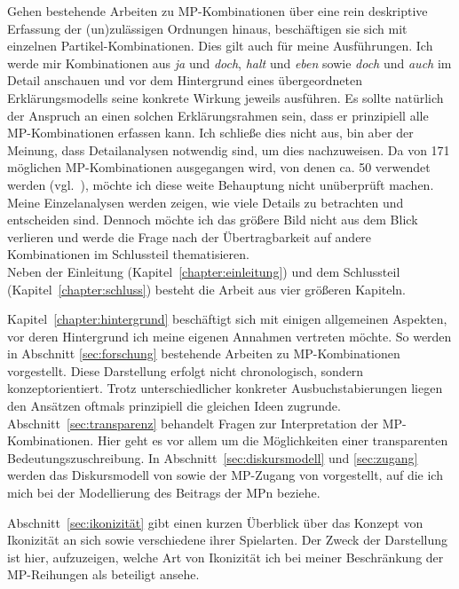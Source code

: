 \noindent
Gehen bestehende Arbeiten zu MP-Kom\-bi\-na\-ti\-on\-en über eine rein deskriptive Erfassung der (un)zulässigen Ordnungen hinaus, beschäftigen sie sich mit einzelnen Partikel-Kombinationen. Dies gilt auch für meine Ausführungen. Ich werde mir Kombinationen aus \textit{ja} und \textit{doch}, \textit{halt} und \textit{eben} sowie \textit{doch} und \textit{auch} im Detail anschauen und vor dem Hintergrund eines übergeordneten Erklärungsmodells seine konkrete Wirkung jeweils ausführen. Es sollte natürlich der Anspruch an einen solchen Erklärungsrahmen sein, dass er prinzipiell alle MP-Kom\-bi\-na\-ti\-on\-en erfassen kann. Ich schließe dies nicht aus, bin aber der Meinung, dass Detailana\-lysen notwendig sind, um dies nachzuweisen. Da von 171 möglichen MP-Kombi\-nationen ausgegangen wird, von denen ca. 50 verwendet werden (vgl.\ \citealt[280]{Thurmair1989}), möchte ich diese weite Behauptung nicht unüberprüft machen. Meine Einzelanalysen werden zeigen, wie viele Details zu betrachten und entscheiden sind. Dennoch möchte ich das größere Bild nicht aus dem Blick verlieren und werde die Frage nach der Übertragbarkeit auf andere Kombinationen im Schluss\-teil thematisieren. \\

\noindent
Neben der Einleitung (Kapitel~\ref{chapter:einleitung}) und dem Schlussteil (Kapitel~\ref{chapter:schluss}) besteht die Arbeit aus vier größeren Kapiteln.
 
Kapitel~\ref{chapter:hintergrund} beschäftigt sich mit einigen allgemeinen Aspekten, vor deren Hintergrund ich meine eigenen Annahmen vertreten möchte. So werden in Abschnitt \ref{sec:forschung} bestehende Arbeiten zu MP-Kom\-bi\-na\-ti\-on\-en vorgestellt. Diese Darstellung erfolgt nicht chronologisch, sondern konzeptorientiert. Trotz unterschiedlicher konkreter Ausbuchstabierungen liegen den Ansätzen oftmals prinzi\-piell die gleichen Ideen zugrunde. Abschnitt~\ref{sec:transparenz} behandelt Fragen zur Interpretation der MP-Kom\-bi\-na\-ti\-on\-en. Hier geht es vor allem um die Möglichkeiten einer transparenten Bedeutungszuschreibung. In Abschnitt~\ref{sec:diskursmodell} und \ref{sec:zugang} werden das Diskursmodell von \cite{Farkas2010} sowie der MP-Zugang von \cite{Diewald1998} vorgestellt, auf die ich mich bei der Modellierung des Beitrags der MPn beziehe. 

Abschnitt~\ref{sec:ikonizität} gibt einen kurzen Überblick über das Konzept von Ikonizität an sich sowie verschiedene ihrer Spielarten. Der Zweck der Darstellung ist hier, aufzu\-zeigen, welche Art von Ikonizität ich bei meiner Beschränkung der MP-Reihungen als beteiligt ansehe.

